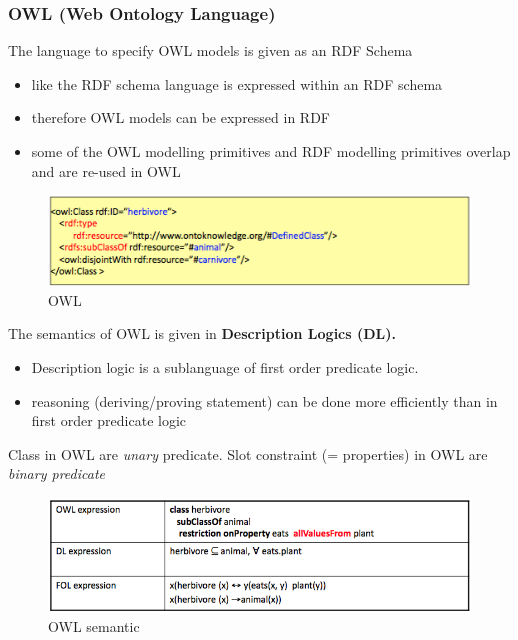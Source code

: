 \subsubsection{OWL (Web Ontology Language)}
The language to specify OWL models is given as an RDF Schema
\begin{itemize}
	\item like the RDF schema language is expressed within an RDF schema
	\item therefore OWL models can be expressed in RDF
	\item some of the OWL modelling primitives and RDF modelling primitives overlap and are re-used in OWL 
\end{itemize}

\begin{figure}[H]
\begin{center}
\includegraphics[width=1\linewidth]{figures/owl.png}
\end{center}
\caption{OWL}
\end{figure}

The semantics of OWL is given in \bf{Description Logics (DL)}. 
\begin{itemize}
	\item Description logic is a sublanguage of first order predicate logic. 
	\item reasoning (deriving/proving statement) can be done more efficiently than in first order predicate logic
\end{itemize}



Class in OWL are \textit{unary} predicate. Slot constraint (= properties) in OWL are \textit{binary predicate}

\begin{figure}[H]
\begin{center}
\includegraphics[width=1\linewidth]{figures/semantic_owl.png}
\end{center}
\caption{OWL semantic}
\end{figure}

